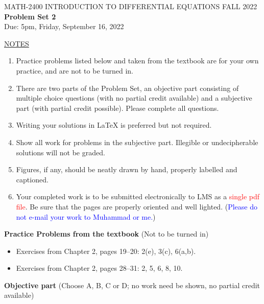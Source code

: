 \documentclass{article}
\begin{document}
\begin{center}
\large{ MATH-2400 \hspace{.27in}  INTRODUCTION TO DIFFERENTIAL EQUATIONS \hspace{.27in}FALL 2022\bigskip\\ {\bf Problem Set 2} \smallskip\\ Due: 5pm, Friday, September 16, 2022}
\end{center}

\bigskip\noindent
\underline{NOTES}
\begin{enumerate}
\item Practice problems listed below and taken from the textbook are for your own practice, and are not to be turned in.
\item There are two parts of the Problem Set, an objective part consisting of multiple choice questions (with no partial credit available) and a subjective part (with partial credit possible).  Please complete all questions.
\item Writing your solutions in {\LaTeX} is preferred but not required.
\item Show all work for problems in the subjective part.  Illegible or undecipherable solutions will not be graded. 
\item Figures, if any, should be neatly drawn by hand, properly labelled and captioned.  
\item Your completed work is to be submitted electronically to LMS  as a \textcolor{red}{single pdf file}. Be sure that the pages are properly oriented and well lighted.  (\textcolor{blue}{Please do not e-mail your work to Muhammad or me.})
\end{enumerate}


\bigskip\noindent
{\bf Practice Problems from the textbook} (Not to be turned in)
\begin{itemize}
\item
Exercises from Chapter 2, pages 19--20: 2(e), 3(c), 6(a,b).
\item
Exercises from Chapter 2, pages 28--31: 2, 5, 6, 8, 10.
\end{itemize}

\bigskip\noindent
{\bf Objective part} (Choose A, B, C or D; no work need be shown, no partial credit available)
\end{document}
